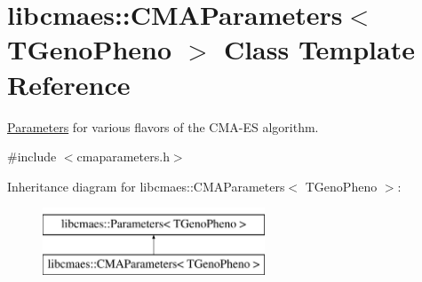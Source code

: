 \hypertarget{classlibcmaes_1_1CMAParameters}{\section{libcmaes\-:\-:C\-M\-A\-Parameters$<$ T\-Geno\-Pheno $>$ Class Template Reference}
\label{classlibcmaes_1_1CMAParameters}
}


\hyperlink{classlibcmaes_1_1Parameters}{Parameters} for various flavors of the C\-M\-A-\/\-E\-S algorithm.  




{\ttfamily \#include $<$cmaparameters.\-h$>$}

Inheritance diagram for libcmaes\-:\-:C\-M\-A\-Parameters$<$ T\-Geno\-Pheno $>$\-:\begin{figure}[H]
\begin{center}
\leavevmode
\includegraphics[height=2.000000cm]{classlibcmaes_1_1CMAParameters}
\end{center}
\end{figure}
